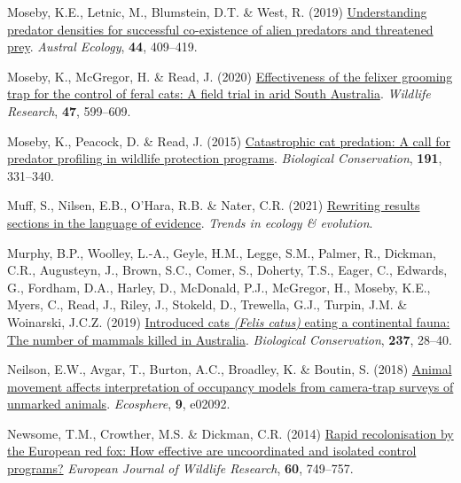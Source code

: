 \documentclass[11pt,a4paper,titlepage,twoside,openright]{style/unimelbthesis}
\newenvironment{CSLReferences}%
  {}%
  {\par}
\begin{document}
\begin{mainmatter}
\begin{CSLReferences}{1}{0}
\leavevmode{}%
Moseby, K.E., Letnic, M., Blumstein, D.T. \& West, R. (2019) \href{https://doi.org/10.1111/aec.12697}{Understanding predator densities for successful co-existence of alien predators and threatened prey}. \emph{Austral Ecology}, \textbf{44}, 409--419.

\leavevmode{}%
Moseby, K., McGregor, H. \& Read, J. (2020) \href{https://doi.org/10.1071/WR19132}{Effectiveness of the felixer grooming trap for the control of feral cats: A field trial in arid {South {A}ustralia}}. \emph{Wildlife Research}, \textbf{47}, 599--609.

\leavevmode{}%
Moseby, K., Peacock, D. \& Read, J. (2015) \href{https://doi.org/10.1016/j.biocon.2015.07.026}{Catastrophic cat predation: A call for predator profiling in wildlife protection programs}. \emph{Biological Conservation}, \textbf{191}, 331--340.

\leavevmode{}%
Muff, S., Nilsen, E.B., O'Hara, R.B. \& Nater, C.R. (2021) \href{https://doi.org/10.1016/j.tree.2021.10.009}{Rewriting results sections in the language of evidence}. \emph{Trends in ecology \& evolution}.

\leavevmode{}%
Murphy, B.P., Woolley, L.-A., Geyle, H.M., Legge, S.M., Palmer, R., Dickman, C.R., Augusteyn, J., Brown, S.C., Comer, S., Doherty, T.S., Eager, C., Edwards, G., Fordham, D.A., Harley, D., McDonald, P.J., McGregor, H., Moseby, K.E., Myers, C., Read, J., Riley, J., Stokeld, D., Trewella, G.J., Turpin, J.M. \& Woinarski, J.C.Z. (2019) \href{https://doi.org/10.1016/j.biocon.2019.06.013}{Introduced cats \emph{({Felis catus})} eating a continental fauna: The number of mammals killed in {{A}ustralia}}. \emph{Biological Conservation}, \textbf{237}, 28--40.

\leavevmode{}%
Neilson, E.W., Avgar, T., Burton, A.C., Broadley, K. \& Boutin, S. (2018) \href{https://doi.org/10.1002/ecs2.2092}{Animal movement affects interpretation of occupancy models from camera-trap surveys of unmarked animals}. \emph{Ecosphere}, \textbf{9}, e02092.

\leavevmode{}%
Newsome, T.M., Crowther, M.S. \& Dickman, C.R. (2014) \href{https://doi.org/10.1007/s10344-014-0844-x}{Rapid recolonisation by the {E}uropean red fox: How effective are uncoordinated and isolated control programs?} \emph{European Journal of Wildlife Research}, \textbf{60}, 749--757.


\end{CSLReferences}
\end{mainmatter}
\end{document}
